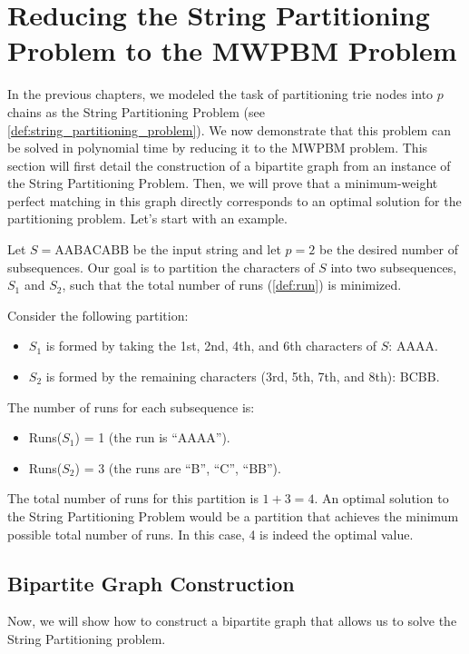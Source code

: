 \section{Reducing the String Partitioning Problem to the MWPBM Problem}
\label{sec:reduction_to_mwpbm}

In the previous chapters, we modeled the task of partitioning trie nodes into $p$ chains as the String Partitioning Problem (see \cref{def:string_partitioning_problem}). We now demonstrate that this problem can be solved in polynomial time by reducing it to the MWPBM problem. This section will first detail the construction of a bipartite graph from an instance of the String Partitioning Problem. Then, we will prove that a minimum-weight perfect matching in this graph directly corresponds to an optimal solution for the partitioning problem. Let's start with an example.

\begin{example}
    \label{ex:string_partitioning}
    Let $S = \text{AABACABB}$ be the input string and let $p=2$ be the desired number of subsequences. Our goal is to partition the characters of $S$ into two subsequences, $S_1$ and $S_2$, such that the total number of runs (\cref{def:run}) is minimized.

    Consider the following partition:
    \begin{itemize}
        \item $S_1$ is formed by taking the 1st, 2nd, 4th, and 6th characters of $S$: $\text{AAAA}$.
        \item $S_2$ is formed by the remaining characters (3rd, 5th, 7th, and 8th): $\text{BCBB}$.
    \end{itemize}
    
    The number of runs for each subsequence is:
    \begin{itemize}
        \item Runs($S_1$) = 1 (the run is ``AAAA'').
        \item Runs($S_2$) = 3 (the runs are ``B'', ``C'', ``BB'').
    \end{itemize}
    
    The total number of runs for this partition is $1 + 3 = 4$. An optimal solution to the String Partitioning Problem would be a partition that achieves the minimum possible total number of runs. In this case, 4 is indeed the optimal value.
\end{example}

\subsection{Bipartite Graph Construction}
Now, we will show how to construct a bipartite graph that allows us to solve the
String Partitioning problem.

